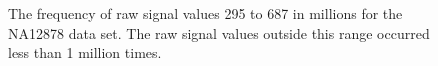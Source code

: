 \begin{figure}
	\centering

\caption{\label{fig:data-hist}The frequency of raw signal values 295 to 687 in millions for the NA12878 data set. The raw signal values outside this range occurred less than 1 million times.}
\end{figure}
